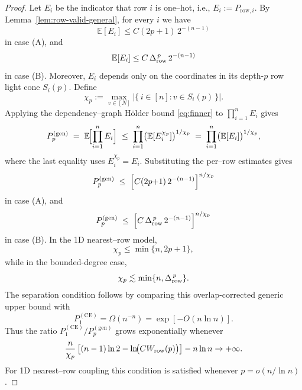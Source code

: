 \documentclass[a4paper,onecolumn,11pt,unpublished]{quantumarticle}
\theoremstyle{remark}
\begin{document}
\begin{proof}
Let $E_i$ be the indicator that row $i$ is one–hot, i.e., $E_i:=P_{\mathrm{row},i}$.
By Lemma~\ref{lem:row-valid-general}, for every $i$ we have
\[
  \mathbb{E}[E_i]\le C(2p{+}1)\,2^{-(n-1)}
\]
in case (A), and
\[
  \mathbb{E}[E_i]\le C\,\Delta_{\rm row}^{\,p}\,2^{-(n-1)}
\]
in case (B). Moreover, $E_i$ depends only on the coordinates in its
depth-$p$ row light cone $S_i(p)$. Define
\[
  \chi_p
  :=
  \max_{v\in[N]}
  \left|\{\,i\in[n]: v\in S_i(p)\,\}\right|.
\]
Applying the dependency–graph Hölder bound \eqref{eq:finner} to
$\prod_{i=1}^n E_i$ gives
\[
  P_p^{(\mathrm{gen})}
  \;=\; \mathbb{E}\!\Bigl[\prod_{i=1}^n E_i\Bigr]
  \;\le\; \prod_{i=1}^n \bigl(\mathbb{E}[E_i^{\chi_p}]\bigr)^{1/\chi_p}
  \;=\; \prod_{i=1}^n \bigl(\mathbb{E}[E_i]\bigr)^{1/\chi_p},
\]
where the last equality uses $E_i^{\chi_p}=E_i$. Substituting the per–row
estimates gives
\[
  P_p^{(\mathrm{gen})}
  \;\le\;
  \Bigl[C(2p{+}1)\,2^{-(n-1)}\Bigr]^{n/\chi_p}
\]
in case (A), and
\[
  P_p^{(\mathrm{gen})}
  \;\le\;
  \Bigl[C\,\Delta_{\rm row}^{\,p}\,2^{-(n-1)}\Bigr]^{n/\chi_p}
\]
in case (B). In the 1D nearest–row model,
\[
  \chi_p\le \min\{n,2p+1\},
\]
while in the bounded-degree case,
\[
  \chi_p\lesssim \min\{n,\Delta_{\rm row}^{\,p}\}.
\]
The separation condition follows by comparing this overlap-corrected generic
upper bound with
\[
  P_{1}^{\mathrm{(CE)}}=\Omega(n^{-n})
  =
  \exp[-O(n\ln n)].
\]
Thus the ratio $P_{1}^{\mathrm{(CE)}}/P_{p}^{\mathrm{(gen)}}$ grows
exponentially whenever
\[
  \frac{n}{\chi_p}
  \left[
    (n-1)\ln 2
    -
    \ln\!\bigl(CW_{\rm row}(p)\bigr)
  \right]
  -
  n\ln n
  \to +\infty.
\]
For 1D nearest–row coupling this condition is satisfied whenever
$p=o(n/\ln n)$.
\end{proof}




\end{document}
